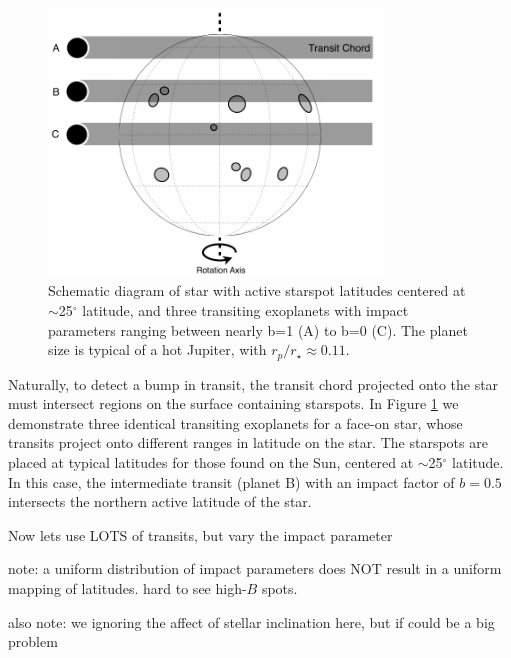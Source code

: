 \documentclass[preprint2]{aastex61}
\begin{document}
\begin{figure}[!t]
\centering
\includegraphics[width=3.5in]{diagram1}
\caption{
Schematic diagram of star with active starspot latitudes centered at $\sim$25$^\circ$ latitude, and three transiting exoplanets with impact parameters ranging between nearly b=1 (A) to  b=0 (C). The planet size is typical of a hot Jupiter, with $r_p/r_\star\approx0.11$.
}
\label{fig:diagram1}
\end{figure}


Naturally, to detect a bump in transit, the transit chord projected onto the star must intersect regions on the surface containing starspots. In Figure \ref{fig:diagram1} we demonstrate three identical transiting exoplanets for a face-on star, whose transits project onto different ranges in latitude on the star. The starspots are placed at typical latitudes for those found on the Sun, centered at $\sim$25$^\circ$ latitude. In this case, the intermediate transit (planet B) with an impact factor of $b=0.5$ intersects the northern active latitude of the star. 








Now lets use LOTS of transits, but vary the impact parameter

note: a uniform distribution of impact parameters does NOT result in a uniform mapping of latitudes. hard to see high-$B$ spots.

also note: we ignoring the affect of stellar inclination here, but if could be a big problem
\end{document}
